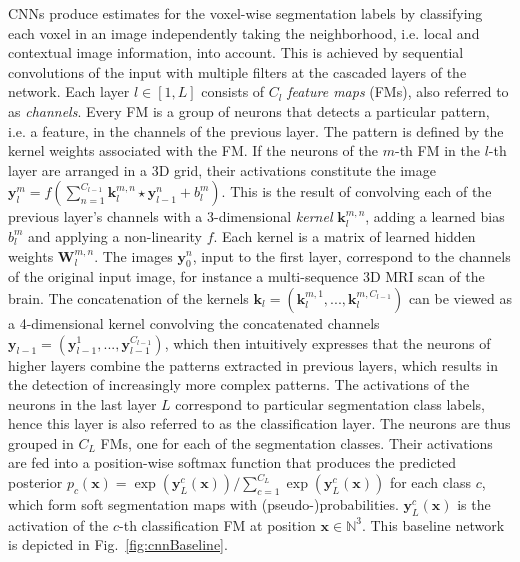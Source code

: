 \documentclass[preprint,authoryear,12pt]{elsarticle}
\begin{document}
CNNs produce estimates for the voxel-wise segmentation labels by classifying each voxel in an image independently taking the neighborhood, i.e. local and contextual image information, into account. This is achieved by sequential convolutions of the input with multiple filters at the cascaded layers of the network. Each layer $l\in [1,L]$ consists of $C_l$ \textit{feature maps} (FMs), also referred to as \textit{channels}. Every FM is a group of neurons that detects a particular pattern, i.e. a feature, in the channels of the previous layer. The pattern is defined by the kernel weights associated with the FM. If the neurons of the $m$-th FM in the $l$-th layer are arranged in a 3D grid, their activations constitute the image $\mathbf{y}^{m}_{l} = f( \sum_{n=1}^{C_{l-1}}{\mathbf{k}^{m,n}_{l} \star \mathbf{y}^{n}_{l-1}} + b^{m}_{l})$. This is the result of convolving each of the previous layer's channels with a 3-dimensional \textit{kernel} $\mathbf{k}^{m,n}_{l}$, adding a learned bias $b^{m}_{l}$ and applying a non-linearity $f$. Each kernel is a matrix of learned hidden weights $\mathbf{W}^{m,n}_{l}$. The images $\mathbf{y}^n_0$, input to the first layer, correspond to the channels of the original input image, for instance a multi-sequence 3D MRI scan of the brain. The concatenation of the kernels $\mathbf{k}_l=(\mathbf{k}^{m,1}_{l},...,\mathbf{k}^{m,C_{l-1}}_{l})$ can be viewed as a 4-dimensional kernel convolving the concatenated channels $\mathbf{y}_{l-1}=(\mathbf{y}^{1}_{l-1}, ..., \mathbf{y}^{C_{l-1}}_{l-1})$, which then intuitively expresses that the neurons of higher layers combine the patterns extracted in previous layers, which results in the detection of increasingly more complex patterns. The activations of the neurons in the last layer $L$ correspond to particular segmentation class labels, hence this layer is also referred to as the classification layer. The neurons are thus grouped in $C_L$ FMs, one for each of the segmentation classes. Their activations are fed into a position-wise softmax function that produces the predicted posterior $p_c(\mathbf{x}) = \exp(\mathbf{y}_L^{c}(\mathbf{x}))/ \sum_{c=1}^{C_L} \exp(\mathbf{y}_L^{c}(\mathbf{x}))$ for each class $c$, which form soft segmentation maps with (pseudo-)probabilities. $\mathbf{y}_L^{c}(\mathbf{x})$ is the activation of the $c$-th classification FM at position $\mathbf{x} \in \mathbb{N}^3$. This baseline network is depicted in Fig.~\ref{fig:cnnBaseline}.
\end{document}
